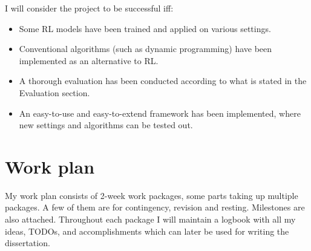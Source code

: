 \documentclass[11pt,a4paper]{article}
\begin{document}
I will consider the project to be successful iff:

\begin{itemize}
    \item
    Some RL models have been trained and applied on various settings.
    \item
    Conventional algorithms (such as dynamic programming) have been implemented as an alternative to RL.
    \item
    A thorough evaluation has been conducted according to what is stated in the Evaluation section.
    \item
    An easy-to-use and easy-to-extend framework has been implemented, where new settings and algorithms can be tested out.
\end{itemize}


\section{Work plan}

My work plan consists of 2-week work packages, some parts taking up multiple packages. A few of them are for contingency, revision and resting. Milestones are also attached. Throughout each package I will maintain a logbook with all my ideas, TODOs, and accomplishments which can later be used for writing the dissertation.
\end{document}
